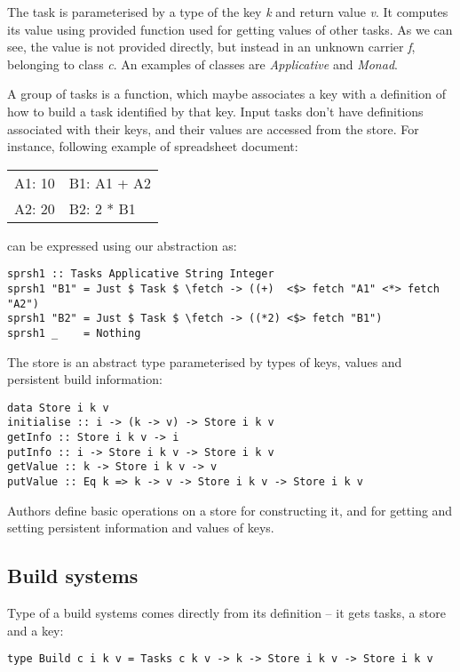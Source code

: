 The task is parameterised by a type of the key \textit{k} and return value \textit{v}. It computes its value using provided function used for getting values of other tasks. As we can see, the value is not provided directly, but instead in an unknown carrier \textit{f}, belonging to class \textit{c}. An examples of classes are \textit{Applicative} and \textit{Monad}.

A group of tasks is a function, which maybe associates a key with a definition of how to build a task identified by that key. Input tasks don't have definitions associated with their keys, and their values are accessed from the store. For instance, following example of spreadsheet document:

\begin{tabular}{ l l }
  A1: 10 & B1: A1 + A2 \\
  A2: 20 & B2: 2 * B1
\end{tabular}

can be expressed using our abstraction as:

\begin{lstlisting}
sprsh1 :: Tasks Applicative String Integer
sprsh1 "B1" = Just $ Task $ \fetch -> ((+)  <$> fetch "A1" <*> fetch "A2")
sprsh1 "B2" = Just $ Task $ \fetch -> ((*2) <$> fetch "B1")
sprsh1 _    = Nothing
\end{lstlisting}

The store is an abstract type parameterised by types of keys, values and persistent build information:

\begin{lstlisting}
data Store i k v
initialise :: i -> (k -> v) -> Store i k v
getInfo :: Store i k v -> i
putInfo :: i -> Store i k v -> Store i k v
getValue :: k -> Store i k v -> v
putValue :: Eq k => k -> v -> Store i k v -> Store i k v
\end{lstlisting}

Authors define basic operations on a store for constructing it, and for getting and setting persistent information and values of keys.

\subsection{Build systems}

Type of a build systems comes directly from its definition -- it gets tasks, a store and a key:

\begin{lstlisting}
type Build c i k v = Tasks c k v -> k -> Store i k v -> Store i k v
\end{lstlisting}

